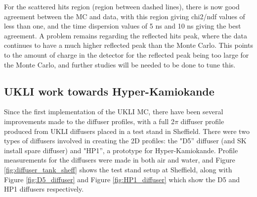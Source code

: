 For the scattered hits region (region between dashed lines), there is now good agreement between the MC and data, with this region giving chi2/ndf values of less than one, and the time dispersion values of 5 ns and 10 ns giving the best agreement. A problem remains regarding the reflected hits peak, where the data continues to have a much higher reflected peak than the Monte Carlo. This points to the amount of charge in the detector for the reflected peak being too large for the Monte Carlo, and further studies will be needed to be done to tune this.


\subsection{UKLI work towards Hyper-Kamiokande}

Since the first implementation of the UKLI MC, there have been several improvements made to the diffuser profiles, with a full 2$\pi$ diffuser profile produced from UKLI diffusers placed in a test stand in Sheffield. There were two types of diffusers involved in creating the 2D profiles: the "D5'' diffuser (and SK install spare diffuser) and "HP1'', a prototype for Hyper-Kamiokande. Profile measurements for the diffusers were made in both air and water, and Figure \ref{fig:diffuser_tank_sheff} shows the test stand setup at Sheffield, along with Figure \ref{fig:D5_diffuser} and Figure \ref{fig:HP1_diffuser} which show the D5 and HP1 diffusers respectively.


